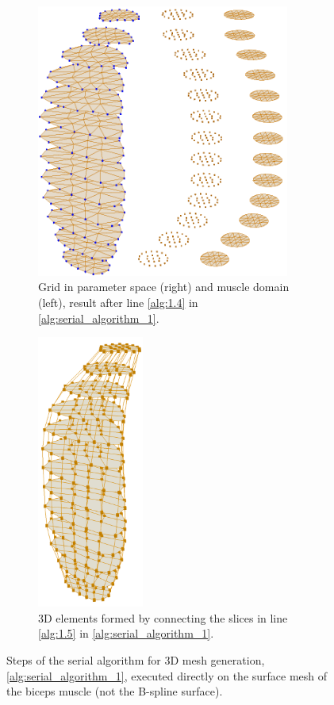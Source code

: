 \begin{figure}
\begin{subfigure}[t]{0.51\textwidth}
    \label{fig:serial_alg_3}%
  \end{subfigure}\\
  \centering%
  \begin{subfigure}[t]{0.49\textwidth}%
    \centering%
    \includegraphics[height=9cm]{images/fiber_creation/serial_alg_4_orange.png}%
    \caption{Grid in parameter space (right) and muscle domain (left), result after line \ref{alg:1.4} in \cref{alg:serial_algorithm_1}.}%
    \label{fig:serial_alg_4}%
  \end{subfigure}
  \hfill{}
  \begin{subfigure}[t]{0.4\textwidth}%
    \centering%
    \includegraphics[height=9cm]{images/fiber_creation/serial_alg_8_orange.png}%
    \caption{3D elements formed by connecting the slices in line \ref{alg:1.5} in \cref{alg:serial_algorithm_1}.}%
    \label{fig:serial_alg_8}%
  \end{subfigure}
  \caption{Steps of the serial algorithm for 3D mesh generation, \cref{alg:serial_algorithm_1}, executed directly on the surface mesh of the biceps muscle (not the B-spline surface).}%
  \label{fig:serial_alg}%
\end{figure}%
%

